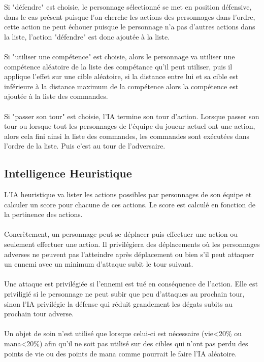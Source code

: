 Si "défendre" est choisie, le personnage sélectionné se met en 
position défensive, dans le cas présent puisque l'on cherche les 
actions des personnages dans l'ordre, cette action ne peut échouer 
puisque le personnage n'a pas d'autres actions dans la liste, 
l'action "défendre" est donc ajoutée à la liste.
\\\\
Si "utiliser une compétence" est choisie, alors le personnage va 
utiliser une compétence aléatoire de la liste des compétance qu'il 
peut utiliser, puis il applique l'effet sur une cible aléatoire, si 
la distance entre lui et sa cible est inférieure à la distance 
maximum de la compétence alors la compétence est ajoutée à la liste 
des commandes.
\\\\
Si "passer son tour" est choisie, l'IA termine son tour d’action.
Lorsque passer son tour ou lorsque tout les personnages de l'équipe 
du joueur actuel ont une action, alors cela fini ainsi la liste des 
commandes, les commandes sont exécutées dans l'ordre de la liste. 
Puis c'est au tour de l'adversaire.
\\

\subsection{Intelligence Heuristique}

L'IA heuristique va lister les actions possibles par personnages 
de son équipe et calculer un score pour chacune de ces actions.
Le score est calculé en fonction de la pertinence des actions.
\\\\
Concrètement, un personnage peut se déplacer puis effectuer une action 
ou seulement effectuer une action.
Il privilégiera des déplacements où les personnages adverses ne peuvent
pas l'atteindre après déplacement ou bien s'il peut attaquer un ennemi
avec un minimum d'attaque subit le tour suivant.
\\\\
Une attaque est privilégiée si l'ennemi est tué en conséquence de
l'action. Elle est priviligié si le personnage ne peut subir que peu 
d'attaques au prochain tour, sinon l'IA privilégie la défense qui réduit
grandement les dégats subits au prochain tour adverse.
\\\\
Un objet de soin n'est utilisé que lorsque celui-ci est nécessaire 
(vie<20\% ou mana<20\%) afin qu'il ne soit pas utilisé sur des cibles 
qui n'ont pas perdu des points de vie ou des points de mana comme 
pourrait le faire l'IA aléatoire.
\\
